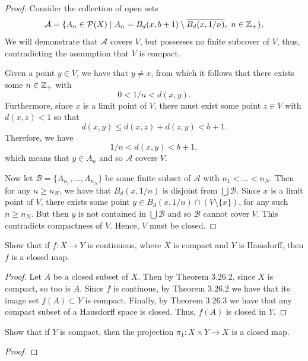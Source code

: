 \begin{solution}
\begin{proof}
    Consider the collection of open sets
    \begin{equation*}
      \mathcal{A} = \{A_n \in \mathcal{P}(X) \mid A_n = B_d(x, b + 1) \setminus \overline{B_d(x, 1/n)},~ n \in \mathbb{Z}_+\}.
    \end{equation*}
    We will demonstrate that $\mathcal{A}$ covers $V$, but possesses no finite subcover of $V$, thus, contradicting the assumption that $V$ is compact.

    Given a point $y \in V$, we have that $y \neq x$, from which it follows that there exists some $n \in \mathbb{Z}_+$ with
    \begin{equation*}
      0 < 1/n < d(x, y).
    \end{equation*}
    Furthermore, since $x$ is a limit point of $V$, there must exist some point $z \in V$ with $d(x, z) < 1$ so that
    \begin{equation*}
      d(x, y) \leq d(x, z) + d(z, y) < b + 1.
    \end{equation*}
    Therefore, we have
    \begin{equation*}
      1 / n < d(x, y) < b + 1,
    \end{equation*}
    which means that $y \in A_n$ and so $\mathcal{A}$ covers $V$.

    Now let $\mathcal{B} = \{A_{n_1}, \ldots, A_{n_N}\}$ be some finite subset of $\mathcal{A}$ with $n_1 < \ldots < n_N$.
    Then for any $n \geq n_N$, we have that $B_d(x, 1/n)$ is disjoint from $\bigcup \mathcal{B}$.
    Since $x$ is a limit point of $V$, there exists some point $y \in B_d(x, 1/n) \cap (V \setminus \{x\})$, for any such $n \geq n_N$.
    But then $y$ is not contained in $\bigcup \mathcal{B}$ and so $\mathcal{B}$ cannot cover $V$.
    This contradicts compactness of $V$.
    Hence, $V$ must be closed.
  \end{proof}
\end{solution}
\newpage

\begin{exercise}[ID=3.26.6]
  Show that if $f: X \rightarrow Y$ is continuous, where $X$ is compact and $Y$ is Hausdorff, then $f$ is a closed map.
\end{exercise}
%
\begin{solution}
  \begin{proof}
    Let $A$ be a closed subset of $X$.
    Then by Theorem 3.26.2, since $X$ is compact, so too is $A$.
    Since $f$ is continous, by Theorem 3.26.2 we have that its image set $f(A) \subset Y$ is compact.
    Finally, by Theorem 3.26.3 we have that any compact subset of a Hausdorff space is closed.
    Thus, $f(A)$ is closed in $Y$.
  \end{proof}
\end{solution}
\newpage

\begin{exercise}[ID=3.26.7]
  Show that if $Y$ is compact, then the projection $\pi_1: X \times Y \rightarrow X$ is a closed map.
\end{exercise}
%
\begin{solution}
  \begin{proof}
  \end{proof}
\end{solution}
\newpage
